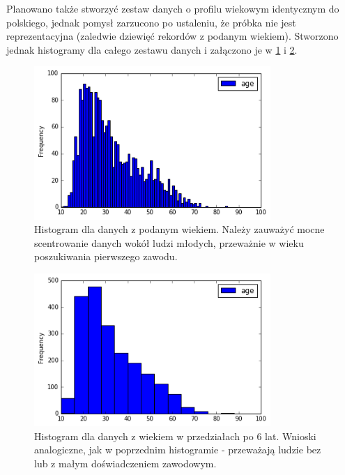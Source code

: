 \documentclass[12pt,a4paper,oneside]{report} %
\begin{document}
Planowano także stworzyć zestaw danych o profilu wiekowym identycznym do polskiego, jednak pomysł zarzucono po ustaleniu, że próbka nie jest reprezentacyjna (zaledwie dziewięć rekordów z podanym wiekiem). Stworzono jednak histogramy dla całego zestawu danych i załączono je w \ref{histo1} i \ref{histo2}. \par

\begin{figure}
\centering
\includegraphics[width=0.8\textwidth]{histo1.png}
\caption[Histogram dla danych z podanym wiekiem]{Histogram dla danych z podanym wiekiem. Należy zauważyć mocne scentrowanie danych wokół ludzi młodych, przeważnie w wieku poszukiwania pierwszego zawodu.\label{histo1}}
\end{figure}

\begin{figure}
\centering
\includegraphics[width=0.8\textwidth]{histo2.png}
\caption[Histogram dla danych z wiekiem w przedziałach po 6 lat]{Histogram dla danych z wiekiem w przedziałach po 6 lat. Wnioski analogiczne, jak w poprzednim histogramie - przeważają ludzie bez lub z małym doświadczeniem zawodowym.\label{histo2}}
\end{figure}
\end{document}
